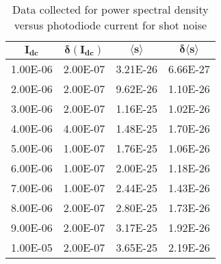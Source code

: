 \begin{table}[H]
	\centering
	\begin{tabular}{cccc} \toprule
		$\mathbf{I_{dc}}$ & $\mathbf{\delta (I_{dc})}$ & $\mathbf{\langle s \rangle}$ & $\mathbf{\delta \langle s \rangle}$ \\ \toprule
		1.00E-06 & 2.00E-07 & 3.21E-26 & 6.66E-27 \\
		2.00E-06 & 2.00E-07 & 9.62E-26 & 1.10E-26 \\
		3.00E-06 & 2.00E-07 & 1.16E-25 & 1.02E-26 \\
		4.00E-06 & 4.00E-07 & 1.48E-25 & 1.70E-26 \\
		5.00E-06 & 1.00E-07 & 1.76E-25 & 1.06E-26 \\
		6.00E-06 & 1.00E-07 & 2.00E-25 & 1.18E-26 \\
		7.00E-06 & 1.00E-07 & 2.44E-25 & 1.43E-26 \\
		8.00E-06 & 2.00E-07 & 2.80E-25 & 1.73E-26 \\
		9.00E-06 & 2.00E-07 & 3.17E-25 & 1.92E-26 \\
		1.00E-05 & 2.00E-07 & 3.65E-25 & 2.19E-26 \\
		\bottomrule
	\end{tabular}
	\caption{Data collected for power spectral density versus photodiode current for shot noise}
	\label{shotCurrentTable}
\end{table}